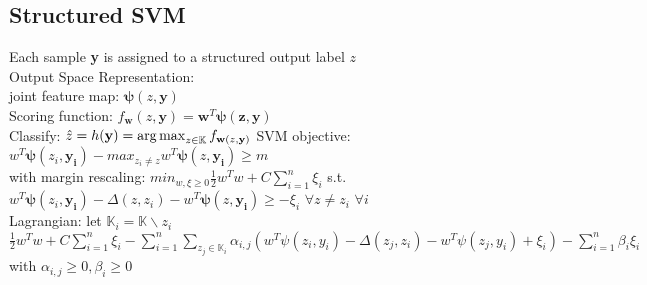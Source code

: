 \subsection*{Structured SVM}
Each sample \textbf{y} is assigned to a structured output label $z$\\
Output Space Representation:\\
joint feature map: $\mathbf{\psi}(z,\mathbf{y})$\\
Scoring function: $f_{\mathbf{w}}(z,\mathbf{y})=\mathbf{w}^T\mathbf{\psi(z, \mathbf{y})}$\\
Classify: $\hat{z}=h(\mathbf{y})=\operatorname*{arg\,max}_{z\in\mathbb{K}}f_{\mathbf{w}(z, \mathbf{y})}$
SVM objective: \\ $w^T\mathbf{\psi}(z_i,\mathbf{y_i})-max_{z_i \neq z}w^T\mathbf{\psi}(z,\mathbf{y_i}) \geq m$ \\
with margin rescaling: $min_{w, \xi \geq 0} \frac{1}{2}w^Tw + C \sum_{i=1}^n \xi_i$ s.t. $w^T\mathbf{\psi}(z_i,\mathbf{y_i})-\Delta(z,z_i)
-w^T\mathbf{\psi}(z,\mathbf{y_i}) \geq - \xi_i$ $\forall z \neq z_i$ $\forall i$ \\
Lagrangian: let $\mathbb{K}_i = \mathbb{K} \backslash {z_i}$ \\ $\frac{1}{2}w^Tw + C \sum_{i=1}^n \xi_i - \sum_{i=1}^n \sum_{z_j \in \mathbb{K}_i} \alpha_{i,j} (w^T \psi(z_i, y_i)- \Delta (z_j, z_i) - w^T \psi(z_j,y_i)+ \xi_i) - \sum_{i=1}^n \beta_i \xi_i$ with $\alpha_{i,j} \geq 0, \beta_i \geq 0$ 
